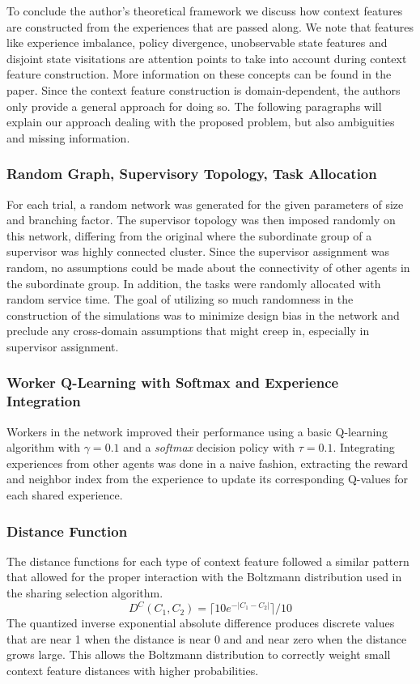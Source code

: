\documentclass[letterpaper]{article}
\begin{document}
To conclude the author’s theoretical framework we discuss how context features are constructed from the experiences that are passed along. We note that features like experience imbalance, policy divergence, unobservable state features and disjoint state visitations are attention points to take into account during context feature construction. More information on these concepts can be found in the paper. Since the context feature construction is domain-dependent, the authors only provide a general approach for doing so. The following paragraphs will explain our approach dealing with the proposed problem, but also ambiguities and missing information.

\subsubsection{Random Graph, Supervisory Topology, Task Allocation}
For each trial, a random network was generated for the given parameters of size and branching factor.  The supervisor topology was then imposed randomly on this network, differing from the original where the subordinate group of a supervisor was highly connected cluster.  Since the supervisor assignment was random, no assumptions could be made about the connectivity of other agents in the subordinate group.  In addition, the tasks were randomly allocated with random service time.  The goal of utilizing so much randomness in the construction of the simulations was to minimize design bias in the network and preclude any cross-domain assumptions that might creep in, especially in supervisor assignment.

\subsubsection{Worker Q-Learning with Softmax and Experience Integration}
Workers in the network improved their performance using a basic Q-learning algorithm with $\gamma = 0.1$ and a \textit{softmax} decision policy with $\tau = 0.1$.  Integrating experiences from other agents was done in a naive fashion, extracting the reward and neighbor index from the experience to update its corresponding Q-values for each shared experience.

\subsubsection{Distance Function}
The distance functions for each type of context feature followed a similar pattern that allowed for the proper interaction with the Boltzmann distribution used in the sharing selection algorithm.
\[D^C(C_1, C_2) = \lceil 10e^{-| C_1 - C_2 |} \rceil / 10\]
The quantized inverse exponential absolute difference produces discrete values that are near 1 when the distance is near 0 and and near zero when the distance grows large.  This allows the Boltzmann distribution to correctly weight small context feature distances with higher probabilities.
\end{document}
